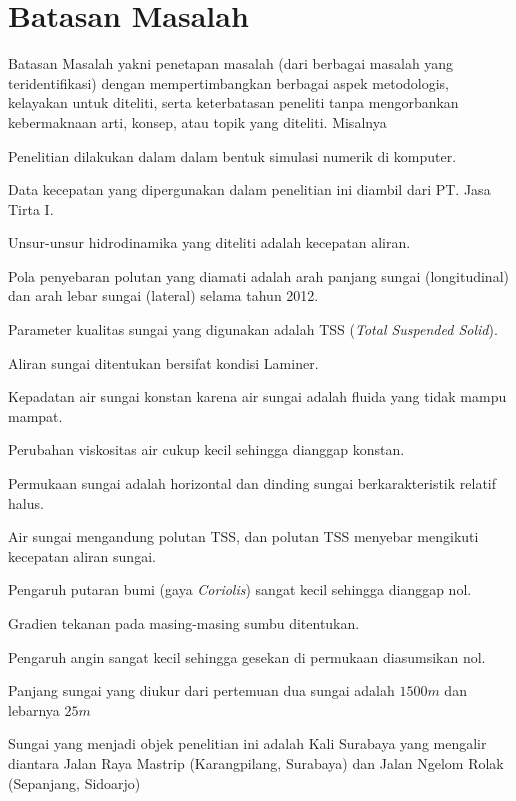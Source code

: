 \section{Batasan Masalah}
Batasan Masalah yakni penetapan masalah (dari berbagai masalah yang teridentifikasi) dengan mempertimbangkan berbagai aspek metodologis, kelayakan untuk diteliti, serta keterbatasan peneliti tanpa mengorbankan kebermaknaan arti, konsep, atau topik yang diteliti. Misalnya
\begin{daftar}
	\item Penelitian dilakukan dalam dalam bentuk simulasi numerik di komputer.
	\item Data kecepatan yang dipergunakan dalam penelitian ini diambil dari PT. Jasa Tirta I.
	\item Unsur-unsur hidrodinamika yang diteliti adalah kecepatan aliran.
	\item Pola penyebaran polutan yang diamati adalah arah panjang sungai (longitudinal) dan arah lebar sungai (lateral) selama tahun 2012.
	\item Parameter kualitas sungai yang digunakan adalah TSS (\textit{Total Suspended Solid}).
	\item Aliran sungai ditentukan bersifat kondisi Laminer.
	\item Kepadatan air sungai konstan karena air sungai adalah fluida yang tidak mampu mampat.
	\item Perubahan viskositas air cukup kecil sehingga dianggap konstan.
	\item Permukaan sungai adalah horizontal dan dinding sungai berkarakteristik relatif halus.
	\item Air sungai mengandung polutan TSS, dan polutan TSS menyebar mengikuti kecepatan aliran sungai.
	\item Pengaruh putaran bumi (gaya \textit{Coriolis}) sangat kecil sehingga dianggap nol.
	\item Gradien tekanan pada masing-masing sumbu ditentukan.
	\item Pengaruh angin sangat kecil sehingga gesekan di permukaan diasumsikan nol.
	\item Panjang sungai yang diukur dari pertemuan dua sungai adalah $1500m$ dan lebarnya $25m$
	\item Sungai yang menjadi objek penelitian ini adalah Kali Surabaya yang mengalir diantara Jalan Raya Mastrip (Karangpilang, Surabaya) dan Jalan Ngelom Rolak (Sepanjang, Sidoarjo)
\end{daftar}

